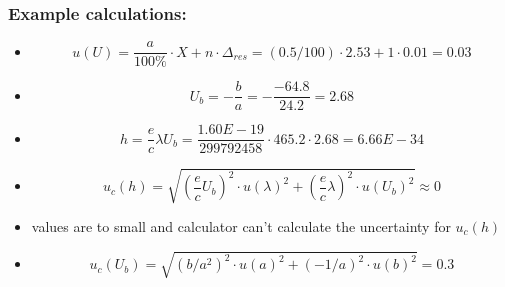 \subsubsection*{Example calculations:}


\begin{itemize}

\item \begin{equation*}
	u(U) = \frac{a}{100\%} \cdot X + n \cdot \Delta_{res} = 
	(0.5/100) \cdot 2.53 + 1 \cdot 0.01 = 0.03 
\end{equation*}
\item \begin{equation*}
	U_b = - \frac{b}{a} = - \frac{-64.8}{24.2} = 2.68
\end{equation*}

\item \begin{equation*}
	h = \frac{e}{c}\lambda U_b = \frac{1.60E-19}{299792458} \cdot 465.2 
	\cdot 2.68 = 6.66E-34
\end{equation*}
\item \begin{equation*}
	u_c(h) = \sqrt{(\frac{e}{c} U_b)^2 \cdot u(\lambda)^2 + (\frac{e}{c} \lambda )^2 \cdot u(U_b)^2} \approx 0
\end{equation*}
\item values are to small and calculator can't calculate the uncertainty for
$u_c(h)$
\item 
\begin{equation*}
	u_c(U_b) = \sqrt{(b/a^2)^2 \cdot u(a)^2 + (-1/a)^2 \cdot u(b)^2} =
	0.3
\end{equation*}

\end{itemize}

